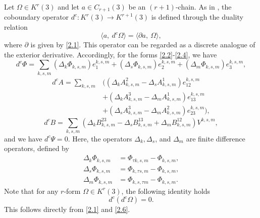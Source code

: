\documentclass[english]{article}
\theoremstyle{plain}
\theoremstyle{definition}
\theoremstyle{remark}
\numberwithin{equation}{section}
\begin{document}
Let $\Omega\in K^r(3)$ and let $a\in C_{r+1}(3)$  be an $(r+1)$-chain. As in \cite{S5},  the coboundary operator $d^c: K^r(3)\rightarrow K^{r+1}(3)$ is defined  through the duality relation
\begin{equation}\label{2.6}
\langle a,  \ d^c \Omega\rangle=\langle \partial a,  \ \Omega\rangle,
\end{equation}
where $\partial$ is given by \eqref{2.1}.
This operator can be regarded as a discrete analogue of the exterior derivative. Accordingly, for the forms \eqref{2.2}-\eqref{2.4}, we have
\begin{equation}\label{2.7}
d^c\Phi=\sum_{k,s,m}(\Delta_k\Phi_{k,s,m})e_1^{k,s,m}+(\Delta_s\Phi_{k,s,m})e_2^{k,s,m}+
(\Delta_m\Phi_{k,s,m})e_3^{k,s,m},
\end{equation}
\begin{align}\label{2.8}
d^cA=\sum_{k,s,m}&\big((\Delta_kA^2_{k,s,m}-\Delta_sA^1_{k,s,m})e_{12}^{k,s,m}\nonumber \\ &+(\Delta_kA^3_{k,s,m}-\Delta_mA^1_{k,s,m})e_{13}^{k,s,m} \nonumber \\
&+
(\Delta_sA^3_{k,s,m}-\Delta_mA^2_{k,s,m})e_{23}^{k,s,m}\big),
\end{align}
\begin{equation}\label{2.9}
d^cB=\sum_{k,s,m}(\Delta_kB^{23}_{k,s,m}-\Delta_sB^{13}_{k,s,m}+\Delta_mB^{12}_{k,s,m})V^{k,s,m},
\end{equation}
and we have $d^c\Psi=0$.
Here, the operators $\Delta_k, \Delta_s$, and $\Delta_m$ are finite difference operators, defined by
\begin{align*}
\Delta_k \Phi_{k,s,m} &= \Phi_{\tau k, s, m} - \Phi_{k,s,m}, \\
\Delta_s \Phi_{k,s,m} &= \Phi_{k, \tau s, m} - \Phi_{k,s,m}, \\
\Delta_m \Phi_{k,s,m} &= \Phi_{k, s, \tau m} - \Phi_{k,s,m}.
\end{align*}
Note that for any $r$-form $\Omega\in K^r(3)$, the following identity holds
\begin{equation}\label{2.10}
d^c(d^c \Omega)=0.
\end{equation}
This follows directly from  \eqref{2.1} and \eqref{2.6}.
\end{document}

